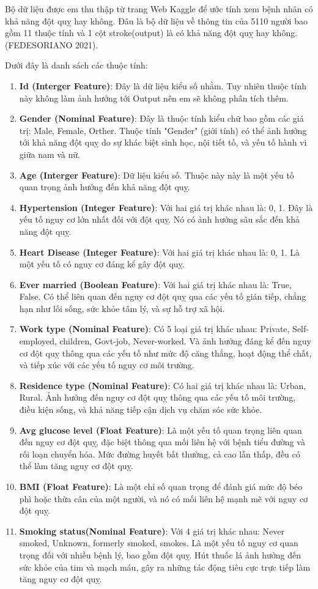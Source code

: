 \documentclass[11pt]{article}
\begin{document}
	
	\hspace{0.6cm}Bộ dữ liệu được em thu thập từ trang Web Kaggle để ước tính xem bệnh nhân có khả năng đột quỵ hay không. Đâu là bộ dữ liệu về thông tin của 5110 người bao gồm 11 thuộc tính và 1 cột stroke(output) là có khả năng đột quỵ hay không. (FEDESORIANO 2021). 
	
	Dưới đây là danh sách các thuộc tính:
	\begin{enumerate}
		\item \textbf{Id (Interger Feature)}: Đây là dữ liệu kiểu số nhằm. Tuy nhiên thuộc tính này không làm ảnh hưởng tới Output nên em sẽ không phân tích thêm.
		\item \textbf{Gender (Nominal Feature)}: Đây là thuộc tính kiểu chữ bao gồm các giá trị: Male, Female, Orther. Thuộc tính "Gender" (giới tính) có thể ảnh hưởng tới khả năng đột quỵ do sự khác biệt sinh học, nội tiết tố, và yếu tố hành vi giữa nam và nữ.
		\item \textbf{Age (Interger Feature)}: Dữ liệu kiểu số. Thuộc này này là một yếu tố quan trọng ảnh hưởng đến khả năng đột quỵ.
		\item \textbf{Hypertension (Integer Feature)}: Với hai giá trị khác nhau là: 0, 1. Đây là yếu tố nguy cơ lớn nhất đối với đột quỵ. Nó có ảnh hưởng sâu sắc đến khả năng đột quỵ.
		\item \textbf{Heart Disease (Integer Feature)}: Với hai giá trị khác nhau là: 0, 1. Là một yếu tố có nguy cơ đáng kể gây đột quỵ. 
		\item \textbf{Ever married (Boolean Feature)}: Với hai giá trị khác nhau là: True, False. Có thể liên quan đến nguy cơ đột quỵ qua các yếu tố gián tiếp, chẳng hạn như lối sống, sức khỏe tâm lý, và sự hỗ trợ xã hội.
		\item \textbf{Work type (Nominal Feature)}: Có 5 loại giá trị khác nhau: Private, Self-employed, children, Govt-job, Never-worked. Và ảnh hưởng đáng kể đến nguy cơ đột quỵ thông qua các yếu tố như mức độ căng thẳng, hoạt động thể chất, và tiếp xúc với các yếu tố nguy cơ môi trường.
		\item \textbf{Residence type (Nominal Feature)}: Có hai giá trị khác nhau là: Urban, Rural. Ảnh hưởng đến nguy cơ đột quỵ thông qua các yếu tố môi trường, điều kiện sống, và khả năng tiếp cận dịch vụ chăm sóc sức khỏe.
		\item \textbf{Avg glucose level (Float Feature)}: Là một yếu tố quan trọng liên quan đến nguy cơ đột quỵ, đặc biệt thông qua mối liên hệ với bệnh tiểu đường và rối loạn chuyển hóa. Mức đường huyết bất thường, cả cao lẫn thấp, đều có thể làm tăng nguy cơ đột quỵ.
		\item \textbf{BMI (Float Feature)}: Là một chỉ số quan trọng để đánh giá mức độ béo phì hoặc thừa cân của một người, và nó có mối liên hệ mạnh mẽ với nguy cơ đột quỵ.
		\item \textbf{Smoking status(Nominal Feature)}: Với 4 giá trị khác nhau: Never smoked, Unknown, formerly smoked, smokes. Là một yếu tố nguy cơ quan trọng đối với nhiều bệnh lý, bao gồm đột quỵ. Hút thuốc lá ảnh hưởng đến sức khỏe của tim và mạch máu, gây ra những tác động tiêu cực trực tiếp làm tăng nguy cơ đột quỵ. 
	\end{enumerate}
	
\end{document}

